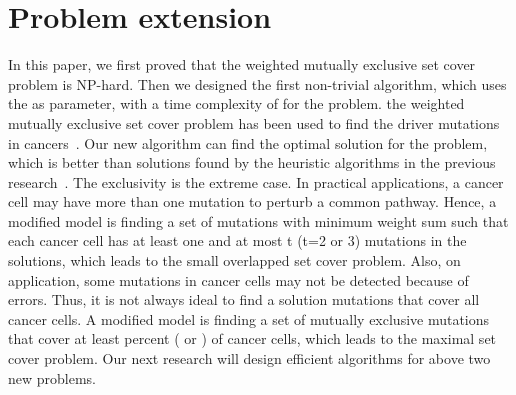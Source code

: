 \documentclass[11pt]{article}
\begin{document}
\section{Problem extension}
In this paper, we first proved that the {\sc weighted mutually
exclusive set cover} problem is NP-hard. Then we designed the
first non-trivial algorithm, which uses the  as parameter, with
a time complexity of  for the problem. the {\sc
weighted mutually exclusive set cover} problem has been used to
find the driver mutations in cancers~\cite{Ciriello,Miller}. Our
new algorithm can find the optimal solution for the problem, which
is better than solutions found by the heuristic algorithms in the
previous research~\cite{Ciriello,Miller}. The exclusivity is the
extreme case. In practical applications, a cancer cell may have
more than one mutation to perturb a common pathway. Hence, a
modified model is finding a set of mutations with minimum weight
sum such that each cancer cell has at least one and at most t (t=2
or 3) mutations in the solutions, which leads to the {\sc small
overlapped set cover} problem. Also, on application, some
mutations in cancer cells may not be detected because of errors.
Thus, it is not always ideal to find a solution mutations that
cover all cancer cells. A modified model is finding a set of
mutually exclusive mutations that cover at least  percent
( or ) of cancer cells, which leads to the {\sc
maximal set cover} problem. Our next research will design
efficient algorithms for above two new problems.
\end{document}
